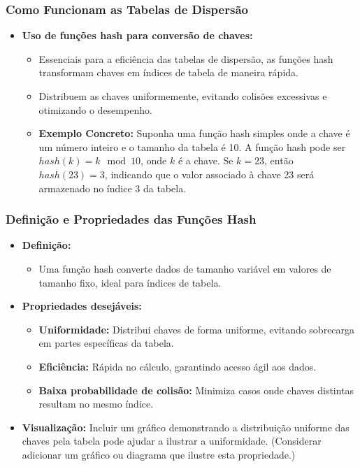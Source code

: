 \begin{frame}[fragile]
  \frametitle{Como Funcionam as Tabelas de Dispersão}
  \begin{itemize}
    \item \textbf{Uso de funções hash para conversão de chaves:}
      \begin{itemize}
        \item Essenciais para a eficiência das tabelas de dispersão, as funções hash transformam chaves em índices de tabela de maneira rápida.
        \item Distribuem as chaves uniformemente, evitando colisões excessivas e otimizando o desempenho.
        \item \textbf{Exemplo Concreto:} Suponha uma função hash simples onde a chave é um número inteiro e o tamanho da tabela é 10. A função hash pode ser \(hash(k) = k \mod 10\), onde \(k\) é a chave. Se \(k = 23\), então \(hash(23) = 3\), indicando que o valor associado à chave 23 será armazenado no índice 3 da tabela.
      \end{itemize}
  \end{itemize}
\end{frame}


\begin{frame}[fragile]
  \frametitle{Definição e Propriedades das Funções Hash}
  \begin{itemize}
    \item \textbf{Definição:} 
      \begin{itemize}
        \item Uma função hash converte dados de tamanho variável em valores de 
        tamanho fixo, ideal para índices de tabela.
      \end{itemize}
    \item \textbf{Propriedades desejáveis:}
      \begin{itemize}
        \item \textbf{Uniformidade:} Distribui chaves de forma uniforme, 
        evitando sobrecarga em partes específicas da tabela.
        \item \textbf{Eficiência:} Rápida no cálculo, garantindo acesso ágil 
        aos dados.
        \item \textbf{Baixa probabilidade de colisão:} Minimiza casos onde 
        chaves distintas resultam no mesmo índice.
      \end{itemize}
    \item \textbf{Visualização:} Incluir um gráfico demonstrando a distribuição 
    uniforme das chaves pela tabela pode ajudar a ilustrar a uniformidade. 
    (Considerar adicionar um gráfico ou diagrama que ilustre esta propriedade.)
  \end{itemize}
\end{frame}

